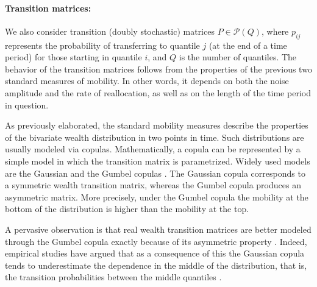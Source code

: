 \documentclass[11pt]{article}
\newcommand{\ie}{{\it i.e.}\xspace}
\numberwithin{equation}{section}
\begin{document}

\paragraph{Transition matrices:} We also consider transition (doubly stochastic) matrices $P \in \mathscr{P}\left(Q\right)$, where $p_{ij}$ represents the probability of transferring to quantile $j$ (at the end of a time period) for those starting in quantile $i$, and $Q$ is the number of quantiles. The behavior of the transition matrices follows from the properties of the previous two standard measures of mobility. In other words, it depends on both the noise amplitude and the rate of reallocation, as well as on the length of the time period in question.

As previously elaborated, the standard mobility measures describe the properties of the bivariate wealth distribution in two points in time. Such distributions are usually modeled via copulas. Mathematically, a copula can be represented by a simple model in which the transition matrix is parametrized. Widely used models are the Gaussian and the Gumbel copulas \citep{TrivediZimmer2007}. The Gaussian copula corresponds to a symmetric wealth transition matrix, whereas the Gumbel copula produces an asymmetric matrix. More precisely, under the Gumbel copula the mobility at the bottom of the distribution is higher than the mobility at the top.

A pervasive observation is that real wealth transition matrices are better modeled through the Gumbel copula exactly because of its asymmetric property \citep{JanttiJenkins2015}. Indeed, empirical studies have argued that as a consequence of this the Gaussian copula tends to underestimate the dependence in the middle of the distribution, that is, the transition probabilities between the middle quantiles \citep{BonhommeRobin2009}. 
\end{document}
